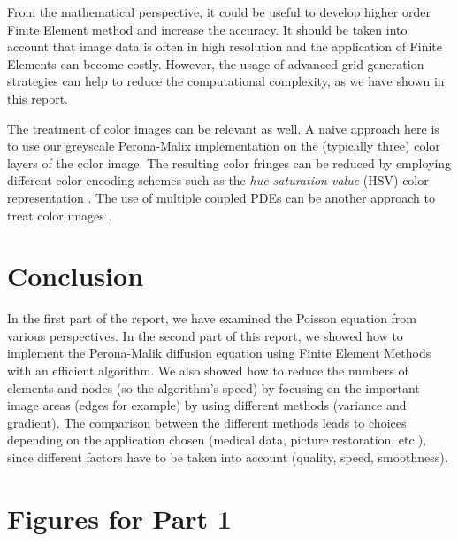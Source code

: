 \documentclass{report}
\begin{document}
From the mathematical perspective, it could be useful to develop higher order Finite Element method and increase the accuracy. It should be taken into account that image data is often in high resolution and the application of Finite Elements can become costly. However, the usage of advanced grid generation strategies can help to reduce the computational complexity, as we have shown in this report.

The treatment of color images can be relevant as well. A naive approach here is to use our greyscale Perona-Malix implementation on the (typically three) color layers of the color image. The resulting color fringes can be reduced by employing different color encoding schemes such as the \emph{hue-saturation-value} (HSV) color representation \citep{bredies2010}. The use of multiple coupled PDEs can be another approach to treat color images \citep{bredies2010}.

\chapter{Conclusion}

In the first part of the report, we have examined the Poisson equation from various perspectives. In the second part of this report, we showed how to implement the Perona-Malik diffusion equation using Finite Element Methods with an efficient algorithm. We also showed how to reduce the numbers of elements and nodes (so the algorithm's speed) by focusing on the important image areas (edges for example) by using different methods (variance and gradient). The comparison between the different methods leads to choices depending on the application chosen (medical data, picture restoration, etc.), since different factors have to be taken into account (quality, speed, smoothness). 



\appendix

\chapter{Figures for Part 1}
\end{document}
